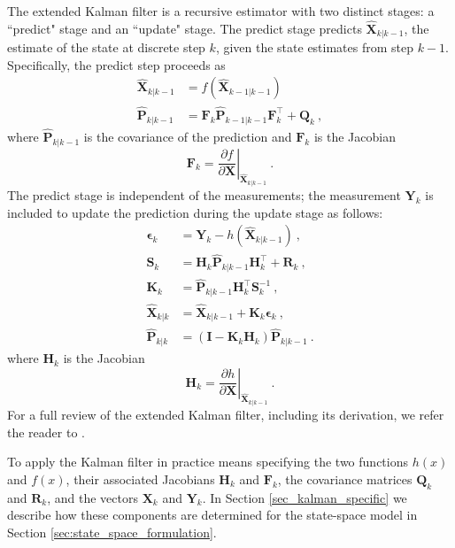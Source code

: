 \documentclass[fleqn,usenatbib,useAMS]{mnras}
\begin{document}
The extended Kalman filter is a recursive estimator with two distinct stages: a ``predict" stage and an ``update" stage. The predict stage predicts $\hat{\boldsymbol{X}}_{k|k-1}$, the estimate of the state at discrete step $k$, given the state estimates from step $k-1$. Specifically, the predict step proceeds as
\begin{align}
	\hat{\boldsymbol{X}}_{k|k-1} &=  f \left( \hat{\boldsymbol{X}}_{k-1|k-1}\right) \\
	\hat{\boldsymbol{P}}_{k|k-1} &=  \boldsymbol{F}_k \hat{\boldsymbol{P}}_{k-1|k-1} \boldsymbol{F}_k^\intercal + \boldsymbol{Q}_k  \ ,
\end{align}
where $\hat{\boldsymbol{P}}_{k|k-1}$ is the covariance of the prediction and $\boldsymbol{F}_k$ is the Jacobian
\begin{equation}
	\boldsymbol{F}_k = \left. \frac{\partial f}{\partial \boldsymbol{X} } \right \rvert_{	\hat{\boldsymbol{X}}_{k|k-1}} \ .
\end{equation}
The predict stage is independent of the measurements; the measurement $\boldsymbol{Y}_k$ is included to update the prediction during the update stage as follows:
\begin{align}
	\boldsymbol{\epsilon}_{k} &= \boldsymbol{Y}_k - h \left(\hat{\boldsymbol{X}}_{k|k-1} \right)\ , \\
	\boldsymbol{S}_k &= \boldsymbol{H}_k \hat{\boldsymbol{P}}_{k|k-1} \boldsymbol{H}_k^\intercal + \boldsymbol{R}_k \ , \\
	\boldsymbol{K}_k &= \hat{\boldsymbol{P}}_{k|k-1} \boldsymbol{H}_k^\intercal \boldsymbol{S}_k^{-1} \ ,\label{eq:kalman gain} \\
	\hat{\boldsymbol{X}}_{k|k} &=\hat{\boldsymbol{X}}_{k|k-1} +\boldsymbol{K}_k  \boldsymbol{\epsilon}_{k}  \ , \label{eq:kalmangainupdate} \\
	\hat{\boldsymbol{P}}_{k|k} &= \left( \boldsymbol{I} - \boldsymbol{K}_k \boldsymbol{H}_k \right) 	\hat{\boldsymbol{P}}_{k|k-1} \ .
\end{align}
where $\boldsymbol{H}_k$ is the Jacobian
\begin{equation}
	\boldsymbol{H}_k = \left. \frac{\partial h}{\partial \boldsymbol{X} } \right \rvert_{	\hat{\boldsymbol{X}}_{k|k-1}} \ .
\end{equation}
For a full review of the extended Kalman filter, including its derivation, we refer the reader to \cite{zarchan2000fundamentals}. \newline 

To apply the Kalman filter in practice means specifying the two functions $h(x)$ and $f(x)$, their associated Jacobians $\boldsymbol{H}_k$ and $\boldsymbol{F}_k$, the covariance matrices $\boldsymbol{Q}_k$ and $\boldsymbol{R}_k$, and the vectors $\boldsymbol{X}_k$
and $\boldsymbol{Y}_k$. In Section \ref{sec_kalman_specific} we describe how these components are determined for the state-space model in Section \ref{sec:state_space_formulation}. 
\end{document}
